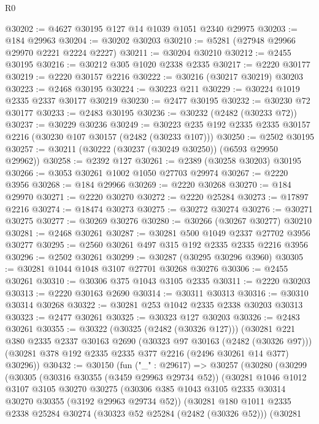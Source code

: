 \begin{lexlean}{R0}
\begin{coremodule}
@30202 := @4627 @30195 @127 @14 @1039 @1051 @2340 @29975
@30203 := @184 @29963
@30204 := @30202 @30203
@30210 := @5281 (@27948 @29966 @29970 @2221 @2224 @2227)
@30211 := @30204 @30210
@30212 := @2455 @30195
@30216 := @30212 @305 @1020 @2338 @2335
@30217 := @2220 @30177
@30219 := @2220 @30157 @2216
@30222 := @30216 (@30217 @30219) @30203
@30223 := @2468 @30195
@30224 := @30223 @211
@30229 := @30224 @1019 @2335 @2337 @30177 @30219
@30230 := @2477 @30195
@30232 := @30230 @72 @30177
@30233 := @2483 @30195
@30236 := @30232 (@2482 (@30233 @72))
@30237 := @30229 @30236
@30249 := @30223 @235 @192 @2335 @2335 @30157 @2216 (@30230 @107 @30157 (@2482 (@30233 @107)))
@30250 := @2502 @30195
@30257 := @30211 (@30222 (@30237 (@30249 @30250)) (@6593 @29950 @29962))
@30258 := @2392 @127
@30261 := @2389 (@30258 @30203) @30195
@30266 := @3053 @30261 @1002 @1050 @27703 @29974
@30267 := @2220 @3956
@30268 := @184 @29966
@30269 := @2220 @30268
@30270 := @184 @29970
@30271 := @2220 @30270
@30272 := @2220 @25284
@30273 := @17897 @2216
@30274 := @18474 @30273
@30275 := @30272 @30274
@30276 := @30271 @30275
@30277 := @30269 @30276
@30280 := @30266 (@30267 @30277) @30210
@30281 := @2468 @30261
@30287 := @30281 @500 @1049 @2337 @27702 @3956 @30277
@30295 := @2560 @30261 @497 @315 @192 @2335 @2335 @2216 @3956
@30296 := @2502 @30261
@30299 := @30287 (@30295 @30296 @3960)
@30305 := @30281 @1044 @1048 @3107 @27701 @30268 @30276
@30306 := @2455 @30261
@30310 := @30306 @375 @1043 @3105 @2335
@30311 := @2220 @30203
@30313 := @2220 @30163 @2690
@30314 := @30311 @30313
@30316 := @30310 @30314 @30268
@30322 := @30281 @253 @1042 @2335 @2338 @30203 @30313
@30323 := @2477 @30261
@30325 := @30323 @127 @30203
@30326 := @2483 @30261
@30355 := @30322
    (@30325 (@2482 (@30326 @127)))
    (@30281
      @221
      @380
      @2335
      @2337
      @30163
      @2690
      (@30323 @97 @30163 (@2482 (@30326 @97)))
      (@30281 @378 @192 @2335 @2335 @377 @2216 (@2496 @30261 @14 @377) @30296))
@30432 := @30150
    (fun ("_" : @29617) =>
    @30257
      (@30280
        (@30299
          (@30305
            (@30316 @30355 (@3459 @29963 @29734 @52))
            (@30281
              @1046
              @1012
              @3107
              @3105
              @30270
              @30275
              (@30306 @385 @1043 @3105 @2335 @30314 @30270 @30355 (@3192 @29963 @29734 @52))
              (@30281
                @180
                @1011
                @2335
                @2338
                @25284
                @30274
                (@30323 @52 @25284 (@2482 (@30326 @52)))
                (@30281

\end{coremodule}
\end{lexlean}
